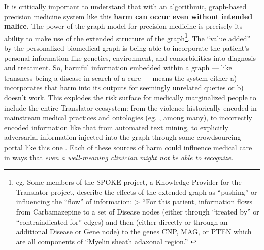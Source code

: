 It is critically important to understand that with an algorithmic,
graph-based precision medicine system like this \textbf{harm can occur
even without intended malice.} The power of the graph model for
precision medicine is precisely its ability to make use of the extended
structure of the graph\footnote{eg. Some members of the SPOKE project, a
  Knowledge Provider for the Translator project, describe the effects of
  the extended graph as ``pushing'' or influencing the ``flow'' of
  information: \textgreater{} ``For this patient, information flows from
  Carbamazepine to a set of Disease nodes (either through ``treated by''
  or ``contraindicated for'' edges) and then (either directly or through
  an additional Disease or Gene node) to the genes CNP, MAG, or PTEN
  which are all components of ``Myelin sheath adaxonal region.'' \cite{nelsonEmbeddingElectronicHealth2021} }. The ``value added'' by
the personalized biomedical graph is being able to incorporate the
patient's personal information like genetics, environment, and
comorbidities into diagnosis and treatment. So, harmful information
embedded within a graph --- like transness being a disease in search of
a cure --- means the system either a) incorporates that harm into its
outputs for seemingly unrelated queries or b) doesn't work. This
explodes the risk surface for medically marginalized people to include
the entire Translator ecosystem: from the violence historically encoded
in mainstream medical practices and ontologies (eg. \cite{ramTransphobiaEncodedExamination2021, ashleyMisuseGenderDysphoria2019} , among many), to incorrectly encoded information like that from
automated text mining, to explicitly adversarial information injected
into the graph through some crowdsourcing portal like
\href{https://collaboratory.semanticscience.org/}{this one} \cite{masstrichtu-idsKnowledgeCollaboratory2022} . Each of these sources of
harm could influence medical care in ways that \emph{even a well-meaning
clinician might not be able to recognize.}

